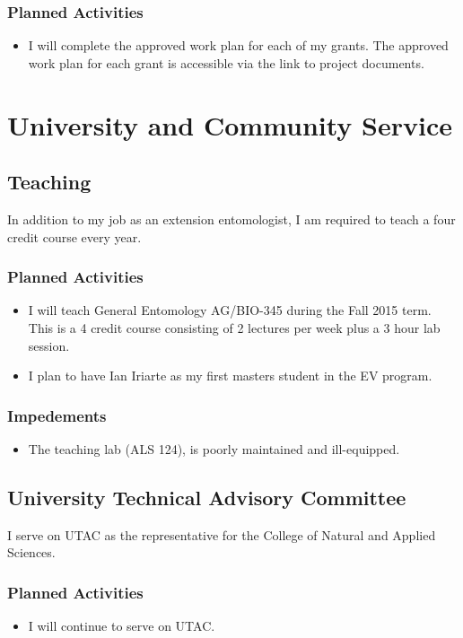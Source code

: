 \documentclass[12pt,oneside,english]{scrbook}
\begin{document}
\subsection{Planned Activities}
\begin{itemize}
\item I will complete the approved work plan for each of my grants. The approved work plan for each grant is accessible via the link to project documents.
\end{itemize}

\chapter{University and Community Service}

\section{Teaching }

In addition to my job as an extension entomologist, I am required to teach a four credit course every year. 

\subsection{Planned Activities}
\begin{itemize}
\item I will teach General Entomology AG/BIO-345 during the Fall 2015 term. This is a 4 credit course consisting of 2 lectures per week plus a 3 hour lab session.
\item I plan to have Ian Iriarte as my first masters student in the EV program.
\end{itemize}

\subsection{Impedements}
\begin{itemize}
\item The teaching lab (ALS 124), is poorly maintained and ill-equipped.
\end{itemize}

\section{University Technical Advisory Committee}

I serve on UTAC as the representative for the College of Natural and
Applied Sciences.

\subsection{Planned Activities}
\begin{itemize}
\item I will continue to serve on UTAC.
\end{itemize}
\end{document}
